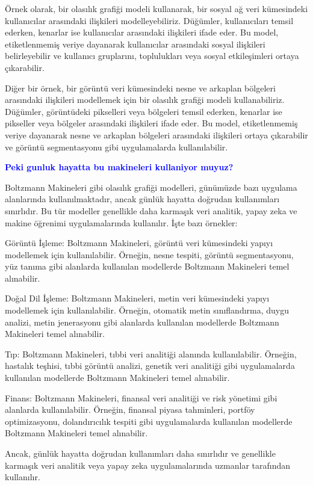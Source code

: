 \documentclass[11pt]{article}
\begin{document}
Örnek olarak, bir olasılık grafiği modeli kullanarak, bir sosyal ağ veri kümesindeki kullanıcılar arasındaki ilişkileri modelleyebiliriz. Düğümler, kullanıcıları temsil ederken, kenarlar ise kullanıcılar arasındaki ilişkileri ifade eder. Bu model, etiketlenmemiş veriye dayanarak kullanıcılar arasındaki sosyal ilişkileri belirleyebilir ve kullanıcı gruplarını, toplulukları veya sosyal etkileşimleri ortaya çıkarabilir.

Diğer bir örnek, bir görüntü veri kümesindeki nesne ve arkaplan bölgeleri arasındaki ilişkileri modellemek için bir olasılık grafiği modeli kullanabiliriz. Düğümler, görüntüdeki pikselleri veya bölgeleri temsil ederken, kenarlar ise pikseller veya bölgeler arasındaki ilişkileri ifade eder. Bu model, etiketlenmemiş veriye dayanarak nesne ve arkaplan bölgeleri arasındaki ilişkileri ortaya çıkarabilir ve görüntü segmentasyonu gibi uygulamalarda kullanılabilir.

\textbf{\textcolor{blue}{Peki gunluk hayatta bu makineleri kullaniyor muyuz?}}

Boltzmann Makineleri gibi olasılık grafiği modelleri, günümüzde bazı uygulama alanlarında kullanılmaktadır, ancak günlük hayatta doğrudan kullanımları sınırlıdır. Bu tür modeller genellikle daha karmaşık veri analitik, yapay zeka ve makine öğrenimi uygulamalarında kullanılır. İşte bazı örnekler:

Görüntü İşleme: Boltzmann Makineleri, görüntü veri kümesindeki yapıyı modellemek için kullanılabilir. Örneğin, nesne tespiti, görüntü segmentasyonu, yüz tanıma gibi alanlarda kullanılan modellerde Boltzmann Makineleri temel alınabilir.

Doğal Dil İşleme: Boltzmann Makineleri, metin veri kümesindeki yapıyı modellemek için kullanılabilir. Örneğin, otomatik metin sınıflandırma, duygu analizi, metin jenerasyonu gibi alanlarda kullanılan modellerde Boltzmann Makineleri temel alınabilir.

Tıp: Boltzmann Makineleri, tıbbi veri analitiği alanında kullanılabilir. Örneğin, hastalık teşhisi, tıbbi görüntü analizi, genetik veri analitiği gibi uygulamalarda kullanılan modellerde Boltzmann Makineleri temel alınabilir.

Finans: Boltzmann Makineleri, finansal veri analitiği ve risk yönetimi gibi alanlarda kullanılabilir. Örneğin, finansal piyasa tahminleri, portföy optimizasyonu, dolandırıcılık tespiti gibi uygulamalarda kullanılan modellerde Boltzmann Makineleri temel alınabilir.

Ancak, günlük hayatta doğrudan kullanımları daha sınırlıdır ve genellikle karmaşık veri analitik veya yapay zeka uygulamalarında uzmanlar tarafından kullanılır.
\end{document}
